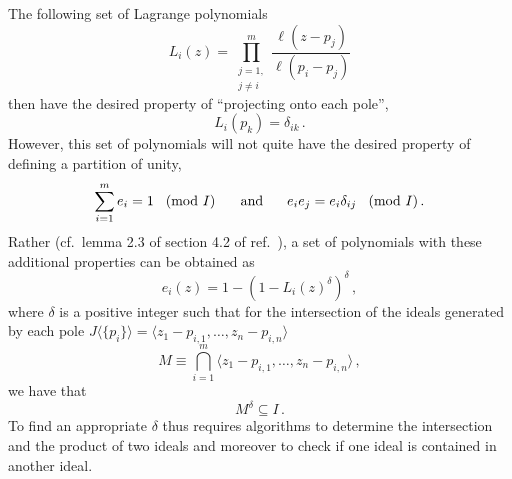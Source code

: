 \documentclass[dvipsnames,preprint,12pt,sort&compress]{elsarticle}
\begin{document}
The following set of Lagrange polynomials
\begin{equation}
L_i (z) = \prod_{\substack{j=1, \\ j \neq i}}^m \frac{\ell(z - p_j)}{\ell(p_i - p_j)}
\label{eq:Lagrangian_polynomials_generic_formula}
\end{equation}
then have the desired property of ``projecting onto each pole'',
\begin{equation}
L_i (p_k) = \delta_{ik} \,.
\label{eq:partition-of-unity_property_1}
\end{equation}
However, this set of polynomials will not quite have the desired
property of defining a partition of unity,
\begin{equation}
\sum_{i=1}^m e_i = 1 \hspace{3mm} \mbox{(mod $I$) \hspace{4mm} and}
\hspace{6mm} e_i e_j = e_i \delta_{ij} \hspace{3mm} \mbox{(mod $I$)} \,.
\label{eq:partition-of-unity_property_2}
\end{equation}
Rather (cf.~lemma 2.3 of section 4.2 of ref.~\cite{UsingAlgebraicGeometry}),
a set of polynomials with these additional properties can be obtained as
\begin{equation}
e_i(z) = 1 - (1 - L_i(z)^\delta)^\delta \,,
\label{eq:partition-of-unity_polynomials}
\end{equation}
where $\delta$ is a positive integer such that for the intersection of the ideals
generated by each pole $J\langle\{ p_i \} \rangle = \langle z_1 - p_{i,1}, \ldots, z_n - p_{i,n} \rangle$
\begin{equation}
M \equiv \bigcap_{i=1}^m \langle z_1 - p_{i,1}, \ldots, z_n - p_{i,n} \rangle \,,
\label{eq:ideal_of_variety}
\end{equation}
we have that
\begin{equation}
M^\delta \subseteq I \,.
\label{eq:delta_definition}
\end{equation}
To find an appropriate $\delta$ thus requires algorithms to determine
the intersection and the product of two ideals and moreover to check
if one ideal is contained in another ideal.
\end{document}
